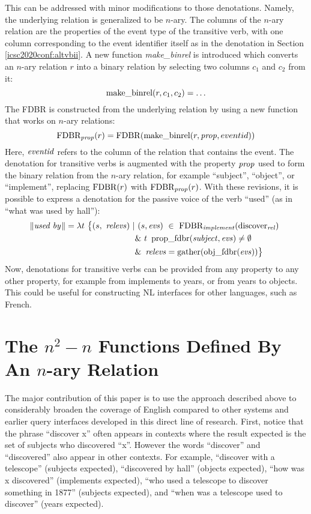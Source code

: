 \documentclass[../main.tex]{subfiles}
\begin{document}
\begin{refsection}
This can be addressed with minor modifications to those denotations. Namely, the underlying relation is generalized to be $n$-ary. The columns of the $n$-ary relation are the properties of the event type of the transitive verb, with one column corresponding to the event identifier itself as in the denotation in Section \ref{icsc2020conf:altvbii}. A new function {\em make\_binrel} is introduced which converts an $n$-ary relation $r$ into a binary relation by selecting two columns $c_1$ and $c_2$ from it:
\[
\text{make\_binrel}({r}, {c_1}, {c_2}) = \ldots
\]
The FDBR is constructed from the underlying relation by using a new function that works on $n$-ary relations:
\[\text{FDBR}_{\operatorname{\mathit{prop}}}(r) = \operatorname{FDBR}({\text{make\_binrel}({r}, {\operatorname{\mathit{prop}}}, {eventid})})\]
Here, $\operatorname{\mathit{eventid}}$ refers to the column of the relation that contains the event.
The denotation for transitive verbs is augmented with the property $\operatorname{\mathit{prop}}$ used to form the binary relation from the $n$-ary relation, for example ``subject'', ``object'', or ``implement'', replacing $\operatorname{FDBR}({r})$ with $\text{FDBR}_{\operatorname{\mathit{prop}}}(r)$.  With these revisions, it is possible to express a denotation for the passive voice of the verb ``used'' (as in ``what was used by hall''):
\begin{equation*}
	\begin{split}
		\meaningof{used by} = \lambda t\ \big\{ (s,\ \opit{relevs})\ |&\ (s, \evs)\ \in\ \dmathrm{FDBR}_{\opit{implement}}(\relation{\discover})\  \\
		& \&\ t\ \propfdbr{\opit{subject}}{\evs} \neq \emptyset \\
		& \&\ \opit{relevs} = \gatherevs{\objfdbr{\evs}} \big\}
	\end{split}
\end{equation*}
Now, denotations for transitive verbs can be provided from any property to any other property, for example from implements to years, or from years to objects. This could be useful for constructing NL interfaces for other languages, such as French.

\section{The $n^2-n$ Functions Defined By An $n$-ary Relation}

The major contribution of this paper is to use the approach described above to considerably broaden the coverage of English compared to other systems and earlier \cite{graphmqslide,peelar2016accommodating} query interfaces developed in this direct line of research.
First, notice that the phrase ``discover x'' often appears in contexts where the result expected is
the set of subjects who discovered ``x''. However the words ``discover'' and ``discovered''
also appear in other contexts. For example, ``discover with a telescope'' (subjects expected), ``discovered by
hall'' (objects expected), ``how was x discovered''  (implements expected), ``who used a telescope
to discover something in 1877'' (subjects expected), and ``when was a telescope used to discover'' (years
expected).


\end{refsection}
\end{document}

